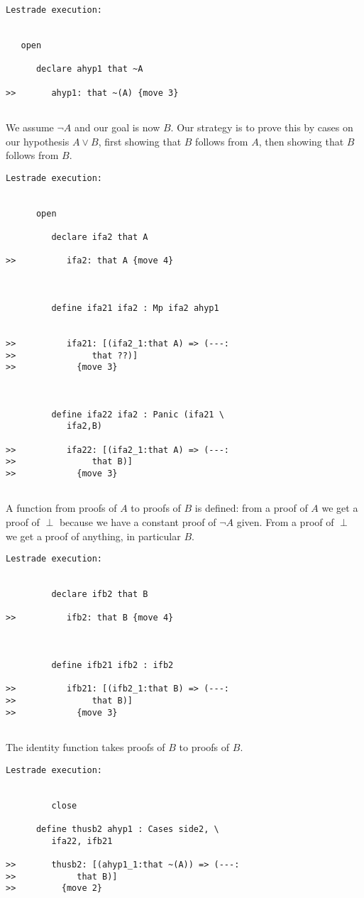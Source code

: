 \documentclass[12pt]{article}
\begin{document}
\begin{verbatim}Lestrade execution:


   open

      declare ahyp1 that ~A

>>       ahyp1: that ~(A) {move 3}


\end{verbatim}

We assume $\neg A$ and our goal is now $B$.  Our strategy is to prove this by cases on our hypothesis $A \vee B$, first showing that $B$ follows from $A$,
then showing that $B$ follows from $B$.

\begin{verbatim}Lestrade execution:


      open

         declare ifa2 that A

>>          ifa2: that A {move 4}



         define ifa21 ifa2 : Mp ifa2 ahyp1


>>          ifa21: [(ifa2_1:that A) => (---:
>>               that ??)]
>>            {move 3}



         define ifa22 ifa2 : Panic (ifa21 \
            ifa2,B)

>>          ifa22: [(ifa2_1:that A) => (---:
>>               that B)]
>>            {move 3}


\end{verbatim}

A function from proofs of $A$ to proofs of $B$ is defined:  from a proof of $A$ we get a proof of $\perp$ because we
have a constant proof of $\neg A$ given.  From a proof of $\perp$ we get a proof of anything, in particular $B$.

\begin{verbatim}Lestrade execution:


         declare ifb2 that B

>>          ifb2: that B {move 4}



         define ifb21 ifb2 : ifb2

>>          ifb21: [(ifb2_1:that B) => (---:
>>               that B)]
>>            {move 3}


\end{verbatim}

The identity function takes proofs of $B$ to proofs of $B$.

\begin{verbatim}Lestrade execution:


         close

      define thusb2 ahyp1 : Cases side2, \
         ifa22, ifb21

>>       thusb2: [(ahyp1_1:that ~(A)) => (---:
>>            that B)]
>>         {move 2}


\end{verbatim}
\end{document}
